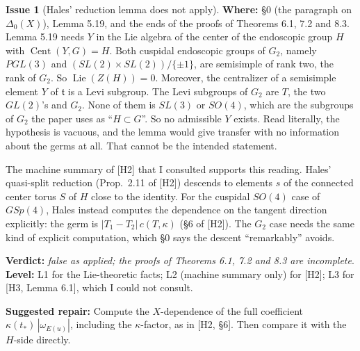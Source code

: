 \documentclass[12pt,letterpaper]{article}
\newcommand{\Lv}[1]{\textsf{L#1}}
\newcommand{\verdict}[1]{\textbf{Verdict:} \emph{#1}.}
\newcommand{\level}[1]{\textbf{Level:} #1.}
\newcommand{\loc}[1]{\textbf{Where:} #1.}
\newcommand{\fix}[1]{\textbf{Suggested repair:} #1}
\theoremstyle{definition}
\newtheorem{issue}{Issue}[section]
\begin{document}
\begin{issue}[Hales' reduction lemma does not apply]\label{iss:reduction}
\loc{\S0 (the paragraph on $\Delta_0(X)$), Lemma 5.19, and the ends of the
proofs of Theorems 6.1, 7.2 and 8.3}
Lemma 5.19 needs $Y$ in the Lie algebra of the center of the endoscopic group
$H$ with $\operatorname{Cent}(Y,G)=H$. Both cuspidal endoscopic groups of
$G_2$, namely $PGL(3)$ and $(SL(2)\times SL(2))/\{\pm1\}$, are semisimple of
rank two, the rank of $G_2$. So $\operatorname{Lie}(Z(H))=0$. Moreover, the
centralizer of a semisimple element $Y$ of $\mathfrak t$ is a Levi subgroup.
The Levi subgroups of $G_2$ are $T$, the two $GL(2)$'s and $G_2$. None of them
is $SL(3)$ or $SO(4)$, which are the subgroups of $G_2$ the paper uses as
``$H\subset G$''. So no admissible $Y$ exists. Read literally, the hypothesis
is vacuous, and the lemma would give transfer with no information about the
germs at all. That cannot be the intended statement.

The machine summary of [H2] that I consulted supports this reading. Hales'
quasi-split reduction (Prop.\ 2.11 of [H2]) descends to elements $s$ of the
connected center torus $S$ of $H$ close to the identity. For the cuspidal
$SO(4)$ case of $GSp(4)$, Hales instead computes the dependence on the tangent
direction explicitly: the germ is $|T_1-T_2|\,c(T,\kappa)$ (\S6 of [H2]).
The $G_2$ case needs the same kind of explicit computation, which \S0 says the
descent ``remarkably'' avoids.

\verdict{false as applied; the proofs of Theorems 6.1, 7.2 and 8.3 are
incomplete}
\level{\Lv{1} for the Lie-theoretic facts; \Lv{2} (machine summary only) for
[H2]; \Lv{3} for [H3, Lemma 6.1], which I could not consult}

\fix{Compute the $X$-dependence of the full coefficient
$\kappa(t_*)\,|\omega_{E(u)}|$, including the $\kappa$-factor, as in [H2,
\S6]. Then compare it with the $H$-side directly.}
\end{issue}
\end{document}
